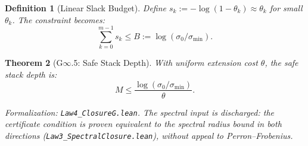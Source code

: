 \documentclass[12pt]{article}
\newtheorem{theorem}{Theorem}[section]
\newtheorem{definition}[theorem]{Definition}
\begin{document}
\begin{definition}[Linear Slack Budget]
Define $s_k := -\log(1 - \theta_k) \approx \theta_k$ for small $\theta_k$. The constraint becomes:
\[
\sum_{k=0}^{m-1} s_k \leq B := \log(\sigma_0 / \sigma_{\min}).
\]
\end{definition}

\begin{theorem}[G$\infty$.5: Safe Stack Depth]
\label{thm:safe-depth}
With uniform extension cost $\theta$, the safe stack depth is:
\[
M \leq \frac{\log(\sigma_0 / \sigma_{\min})}{\theta}.
\]
\end{theorem}
\noindent\textit{Formalization: \texttt{Law4\_ClosureG.lean}. The spectral input is discharged: the certificate condition is proven equivalent to the spectral radius bound in both directions (\texttt{Law3\_SpectralClosure.lean}), without appeal to Perron--Frobenius.}
\end{document}
